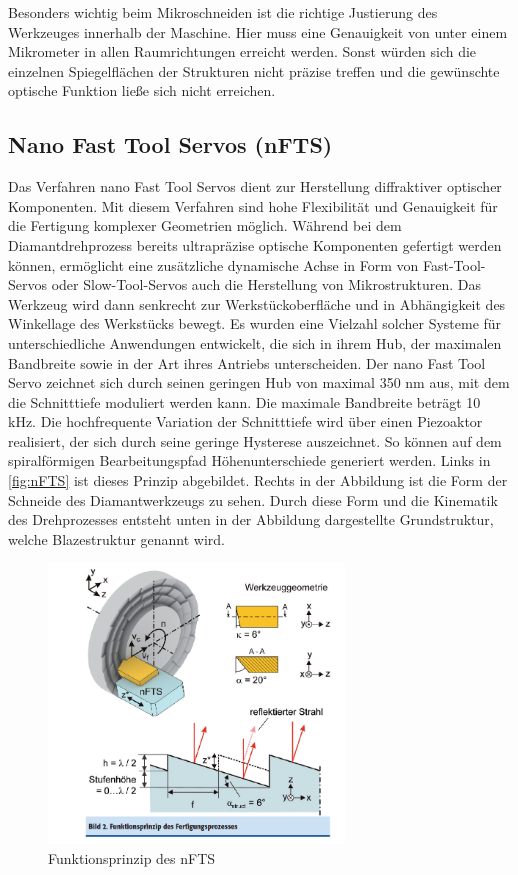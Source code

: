 \documentclass[12pt,a4paper,bibliography=totocnumbered,listof=totocnumbered]{scrartcl}
\begin{document}
\break
Besonders wichtig beim Mikroschneiden ist die richtige Justierung des Werkzeuges innerhalb der Maschine. Hier muss eine Genauigkeit von unter einem Mikrometer in allen Raumrichtungen erreicht werden. Sonst würden sich die einzelnen Spiegelflächen der Strukturen nicht präzise treffen und die gewünschte optische Funktion ließe sich nicht erreichen.




\subsection{Nano Fast Tool Servos (nFTS)}
Das Verfahren nano Fast Tool Servos dient zur Herstellung diffraktiver optischer Komponenten. Mit diesem Verfahren sind hohe Flexibilität und Genauigkeit für die Fertigung komplexer Geometrien möglich. 
Während bei dem Diamantdrehprozess bereits ultrapräzise optische Komponenten gefertigt werden können, ermöglicht eine zusätzliche dynamische Achse in Form von Fast-Tool-Servos oder Slow-Tool-Servos auch die Herstellung von Mikrostrukturen. Das Werkzeug wird dann senkrecht zur Werkstückoberfläche und in Abhängigkeit des Winkellage des Werkstücks bewegt. Es wurden eine Vielzahl solcher Systeme für unterschiedliche Anwendungen entwickelt, die sich in ihrem Hub, der maximalen Bandbreite sowie in der Art ihres Antriebs unterscheiden. Der nano Fast Tool Servo zeichnet sich durch seinen geringen Hub von maximal 350 nm aus, mit dem die Schnitttiefe moduliert werden kann. Die maximale Bandbreite beträgt 10 kHz. Die hochfrequente Variation der Schnitttiefe wird über einen Piezoaktor realisiert, der sich durch seine geringe Hysterese auszeichnet. So können auf dem spiralförmigen Bearbeitungspfad Höhenunterschiede generiert werden. Links in \autoref{fig:nFTS} ist dieses Prinzip abgebildet. Rechts in der Abbildung ist die Form der Schneide des Diamantwerkzeugs zu sehen. Durch diese Form und die Kinematik des Drehprozesses entsteht unten in der Abbildung dargestellte Grundstruktur, welche Blazestruktur genannt wird. 
\begin{figure}[htbp]
\centering 
\includegraphics[width=0.7\textwidth]{nFTS.PNG}
\caption [Gla09]{Funktionsprinzip des nFTS}
\label{fig:nFTS}
\end{figure}
\end{document}
